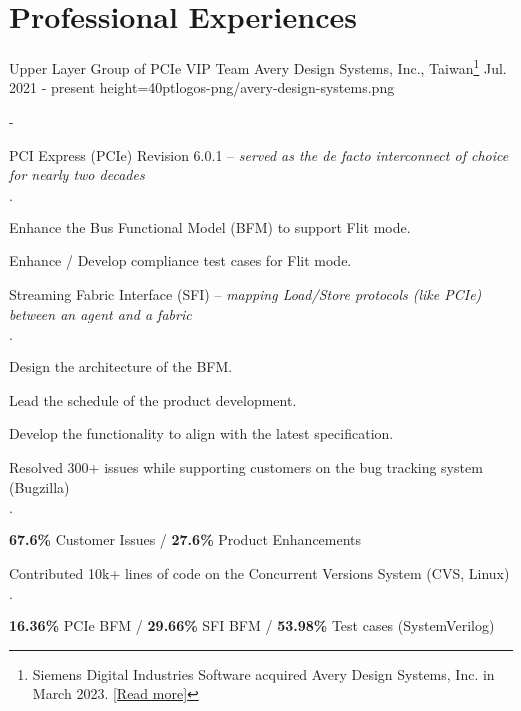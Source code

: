 \documentclass{cvclass}
\begin{document}
\makeinfo


\section{Professional Experiences}

    {Upper Layer Group of PCIe VIP Team}
    {Avery Design Systems, Inc., Taiwan\footnote{Siemens Digital Industries Software acquired Avery Design Systems, Inc. in March 2023. \href{https://newsroom.sw.siemens.com/en-US/siemens-avery-design-systems/}{[Read more]}}}
    {Jul. 2021 - present}
    {height=40pt}{logos-png/avery-design-systems.png}
\begin{plainitemize}{-}
    \item PCI Express\textsuperscript{\tiny\textregistered} (PCIe) Revision 6.0.1 -- \textit{served as the de facto interconnect of choice for nearly two decades}
    \begin{plainitemize}{\(\cdot\)}
        \item Enhance the Bus Functional Model (BFM) to support Flit mode.
        \item Enhance / Develop compliance test cases for Flit mode.
    \end{plainitemize}
    \item Streaming Fabric Interface (SFI) -- \textit{mapping Load/Store protocols (like PCIe) between an agent and a fabric}
    \begin{plainitemize}{\(\cdot\)}
        \item Design the architecture of the BFM.
        \item Lead the schedule of the product development.
        \item Develop the functionality to align with the latest specification.
    \end{plainitemize}
    \item Resolved 300+ issues while supporting customers on the bug tracking system (Bugzilla)
    \begin{plainitemize}{\(\cdot\)}
        \item {\textbf{67.6\%} Customer Issues / \textbf{27.6\%} Product Enhancements}
    \end{plainitemize}
    \item Contributed 10k+ lines of code on the Concurrent Versions System (CVS, Linux)
    \begin{plainitemize}{\(\cdot\)}
        \item \textbf{16.36\%} PCIe BFM / \textbf{29.66\%} SFI BFM / \textbf{53.98\%} Test cases (SystemVerilog)
    \end{plainitemize}
\end{plainitemize}
\end{document}
